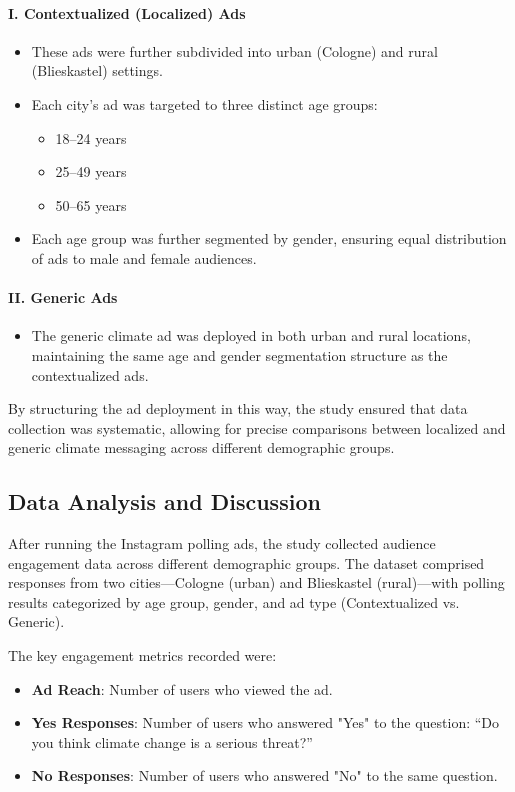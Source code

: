 \documentclass[a4paper,11pt]{article}
\begin{document}
\paragraph{I. Contextualized (Localized) Ads}
\begin{itemize}
    \item These ads were further subdivided into urban (Cologne) and rural (Blieskastel) settings.
    \item Each city’s ad was targeted to three distinct age groups:
    \begin{itemize}
        \item 18–24 years
        \item 25–49 years
        \item 50–65 years
    \end{itemize}
    \item Each age group was further segmented by gender, ensuring equal distribution of ads to male and female audiences.
\end{itemize}

\paragraph{II. Generic Ads}
\begin{itemize}
    \item The generic climate ad was deployed in both urban and rural locations, maintaining the same age and gender segmentation structure as the contextualized ads.
\end{itemize}

By structuring the ad deployment in this way, the study ensured that data collection was systematic, allowing for precise comparisons between localized and generic climate messaging across different demographic groups.

\subsection{Data Analysis and Discussion}
After running the Instagram polling ads, the study collected audience engagement data across different demographic groups. The dataset comprised responses from two cities—Cologne (urban) and Blieskastel (rural)—with polling results categorized by age group, gender, and ad type (Contextualized vs. Generic).

The key engagement metrics recorded were:
\begin{itemize}
    \item \textbf{Ad Reach}: Number of users who viewed the ad.
    \item \textbf{Yes Responses}: Number of users who answered "Yes" to the question: “Do you think climate change is a serious threat?”
    \item \textbf{No Responses}: Number of users who answered "No" to the same question.
\end{itemize}
\end{document}
